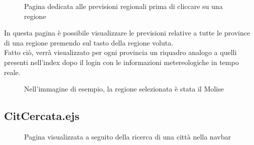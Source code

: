 \begin{figure}[ht]
    \centering
    \caption{Pagina dedicata alle previsioni regionali prima di cliccare su una regione}
\end{figure}

In questa pagina è possibile visualizzare le previsioni relative a tutte le province di una regione 
premendo sul tasto della regione voluta.\\
Fatto ciò, verrà visualizzato per ogni provincia un riquadro analogo a quelli presenti nell'index dopo 
il login con le informazioni metereologiche in tempo reale.

\begin{figure}[ht]
    \centering
    \caption{Nell'immagine di esempio, la regione selezionata è stata il Molise}
\end{figure}

\newpage
\subsection{CitCercata.ejs}

\begin{figure}[ht]
    \centering
    \caption{Pagina visualizzata a seguito della ricerca di una città nella navbar}
\end{figure}

